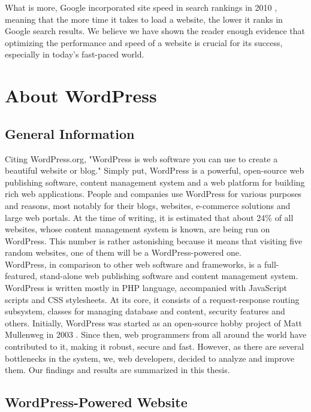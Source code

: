 What is more, Google incorporated site speed in search rankings in 2010 \cite{MattCutts:Google-site-speed-seo}, meaning that the more time it takes to load a website, the lower it ranks in Google search results. We believe we have shown the reader enough evidence that optimizing the performance and speed of a website is crucial for its success, especially in today's fast-paced world.

\section{About WordPress}

\subsection{General Information}

Citing WordPress.org, "WordPress is web software you can use to create a beautiful website or blog."\cite{WP:WP.org} Simply put, WordPress is a powerful, open-source web publishing software, content management system and a web platform for building rich web applications. People and companies use WordPress for various purposes and reasons, most notably for their blogs, websites, e-commerce solutions and large web portals. At the time of writing, it is estimated that about 24\% \cite{W3Techs:WP-usage} of all websites, whose content management system is known, are being run on WordPress. This number is rather astonishing because it means that visiting five random websites, one of them will be a WordPress-powered one. \\

WordPress, in comparison to other web software and frameworks, is a full-featured, stand-alone web publishing software and content management system. WordPress is written mostly in PHP language, accompanied with JavaScript scripts and CSS stylesheets. At its core, it consists of a request-response routing subsystem, classes for managing database and content, security features and others. Initially, WordPress was started as an open-source hobby project of Matt Mullenweg in 2003 \cite{WP:History}. Since then, web programmers from all around the world have contributed to it, making it robust, secure and fast. However, as there are several bottlenecks in the system, we, web developers, decided to analyze and improve them. Our findings and results are summarized in this thesis.

\subsection{WordPress-Powered Website}

